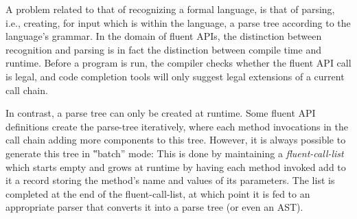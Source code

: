 A problem related to that of recognizing a formal language,
is that of parsing, i.e., creating, for input which is within the language,
  a parse tree according to the language's grammar.
In the domain of fluent APIs, the distinction between recognition and parsing
is in fact the distinction between compile time and runtime.
Before a program is run, the compiler checks whether the fluent API call is
legal, and code completion tools will only suggest legal extensions of a
current call chain.

In contrast, a parse tree can only be created at runtime.
Some fluent API definitions create the parse-tree
  iteratively, where each method invocations in the call chain adding
  more components to this tree.
However, it is always possible to generate this tree in ‟batch” mode:
This is done by maintaining a \emph{fluent-call-list} which
  starts empty and grows at runtime by having each method invoked add to it
  a record storing the method's name and values of its parameters.
The list is completed at the end of the fluent-call-list, at which point it is
fed to an appropriate parser that converts it into a parse tree (or even an
AST).

